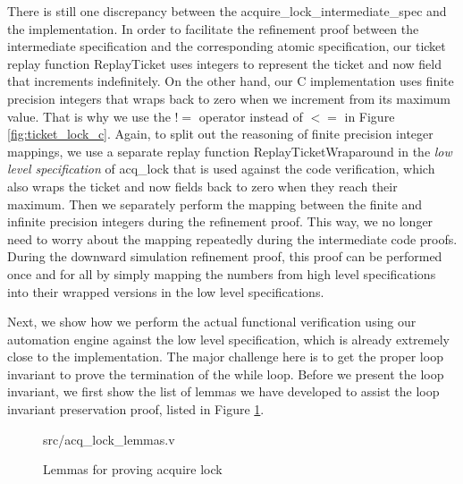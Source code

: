 There is still one discrepancy between the \textsf{acquire\_lock\_intermediate\_spec} and the
implementation. In order to facilitate the refinement proof between the intermediate specification
and the corresponding atomic specification, our ticket replay function \textsf{ReplayTicket}
uses integers to represent the \textsf{ticket} and \textsf{now} field that increments indefinitely.
On the other hand, our C implementation uses finite precision integers that wraps back to zero when
we increment from its maximum value. That is why we use the $!=$ operator instead
of $<=$ in Figure \ref{fig:ticket_lock_c}.
Again, to split out the reasoning of finite precision integer mappings, we use a separate
replay function \textsf{ReplayTicketWraparound} in the \textit{low level specification} of
\textsf{acq\_lock} that is used against the code verification, which also wraps the \textsf{ticket}
and \textsf{now} fields back to zero when they reach their maximum.
Then we separately perform the mapping between
the finite and infinite precision integers during the refinement proof. This way, we no longer
need to worry about the mapping repeatedly during the intermediate code proofs. During
the downward simulation refinement proof, this proof can be performed once and for all by
simply mapping the numbers from high level specifications into their wrapped versions
in the low level specifications.

Next, we show how we perform the actual functional verification using our automation engine
against the low level specification, which is already extremely close to the implementation.
The major challenge here is to get the proper loop invariant to prove the termination of the while
loop. Before we present the loop invariant, we first show the list of lemmas we have developed
to assist the loop invariant preservation proof, listed in Figure \ref{fig:acq_lock_lemmas_v}.

\begin{figure}
	 {src/acq_lock_lemmas.v}
	\caption{Lemmas for proving acquire lock}
	\label{fig:acq_lock_lemmas_v}
\end{figure}

